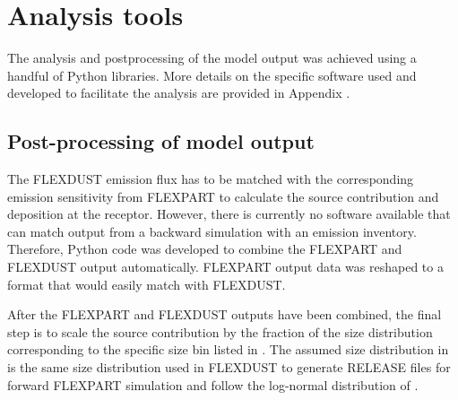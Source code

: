 \section{Analysis tools}

The analysis and postprocessing of the model output was achieved using a handful of Python libraries. More details on the specific software used and developed to facilitate the analysis are provided in Appendix .
\subsection{Post-processing of model output}
The FLEXDUST emission flux has to be matched with the corresponding emission sensitivity from FLEXPART to calculate the source contribution and deposition at the receptor. 
However, there is currently no software available that can match output from a backward simulation with an emission inventory. 
Therefore, Python code was developed to combine the FLEXPART and FLEXDUST output automatically. FLEXPART output data was reshaped to a format that would easily match with FLEXDUST.

After the FLEXPART and FLEXDUST outputs have been combined, the final step is to scale the source contribution by the fraction of the size distribution corresponding to the specific size bin listed in .
The assumed size distribution in  is the same size distribution used in FLEXDUST to generate RELEASE files for forward FLEXPART simulation and follow the log-normal distribution of .  


